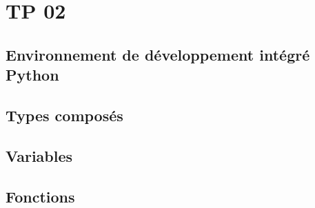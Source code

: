 \setcounter{section}{1}
\section{TP 02}
\subsection{Environnement de développement intégré Python}

\subsection{Types composés}

\subsection{Variables}

\subsection{Fonctions}

